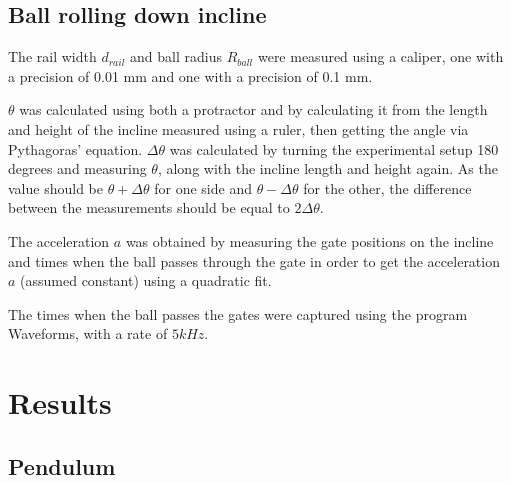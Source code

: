 \documentclass[a4paper,%
               aps,%
               prl,%
               amsfonts,%
               amssymb,%
               amsmath,%
               nobibnotes,%
               twocolumn, %
               twoside,%
               balancelastpage,%
               eqsecnum] %
               {revtex4-1}
\begin{document}
\subsection{Ball rolling down incline}

The rail width $d_{rail}$ and ball radius $R_{ball}$ were measured using a caliper, one with a precision of 0.01 mm and one with a precision of 0.1 mm.

$\theta$ was calculated using both a protractor and by calculating it from the length and height of the incline measured using a ruler, then getting the angle via Pythagoras' equation. $\Delta \theta$ was calculated by turning the experimental setup 180 degrees and measuring $\theta$, along with the incline length and height again. As the value should be $\theta + \Delta \theta$ for one side and $\theta - \Delta \theta$ for the other, the difference between the measurements should be equal to $2 \Delta \theta$.

The acceleration $a$ was obtained by measuring the gate positions on the incline and times when the ball passes through the gate in order to get the acceleration $a$ (assumed constant) using a quadratic fit.

The times when the ball passes the gates were captured using the program Waveforms, with a rate of $5kHz$.



\section{Results}
\subsection{Pendulum}
\end{document}
